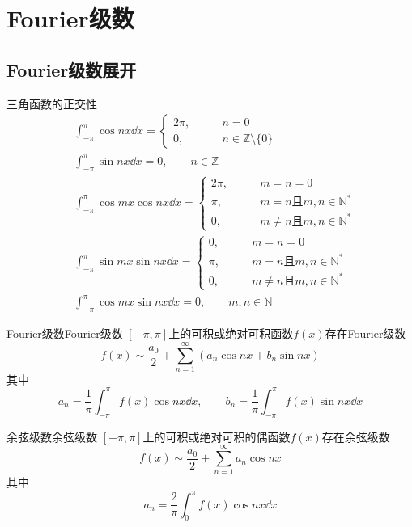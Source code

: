 \documentclass[lang = cn, scheme = chinese, thmcnt = section]{elegantbook}
\newcommand{\N}{\mathbb{N}}            %
\newcommand{\Z}{\mathbb{Z}}            %
\begin{document}
\chapter{Fourier级数}

\section{Fourier级数展开}

\begin{theorem}{三角函数的正交性}
	\begin{align*}
		& \int_{-\pi}^{\pi}\cos nx\dd x=\begin{cases}
			2\pi,\qquad & n=0\\
			0,\qquad & n\in\Z\setminus\{0\}
		\end{cases}\\
		& \int_{-\pi}^{\pi}\sin nx\dd x=0,\qquad n\in\Z\\
		& \int_{-\pi}^{\pi}\cos mx\cos nx \dd x=\begin{cases}
			2\pi,\qquad & m=n=0\\
			\pi,\qquad & m=n\text{且}m,n\in\N^*\\
			0,\qquad & m\ne n\text{且}m,n\in\N^*
		\end{cases}\\
		& \int_{-\pi}^{\pi}\sin mx\sin nx \dd x=\begin{cases}
			0,\qquad & m=n=0\\
			\pi,\qquad & m=n\text{且}m,n\in\N^*\\
			0,\qquad & m\ne n\text{且}m,n\in\N^*
		\end{cases}\\
		& \int_{-\pi}^{\pi}\cos mx\sin nx\dd x=0,\qquad m,n\in\N
	\end{align*}
\end{theorem}

\begin{theorem}{Fourier级数}{Fourier级数}
	$[-\pi,\pi]$上的可积或绝对可积函数$f(x)$存在Fourier级数
	$$
	f(x)\sim\frac{a_0}{2}+\sum_{n=1}^{\infty}(a_n\cos nx+b_n\sin nx)
	$$
	其中
	$$
	a_n=\frac{1}{\pi}\int_{-\pi}^{\pi}f(x)\cos n x\dd x,\qquad 
	b_n=\frac{1}{\pi}\int_{-\pi}^{\pi}f(x)\sin n x\dd x
	$$
\end{theorem}

\begin{theorem}{余弦级数}{余弦级数}
	$[-\pi,\pi]$上的可积或绝对可积的偶函数$f(x)$存在余弦级数
	$$
	f(x)\sim\frac{a_0}{2}+\sum_{n=1}^{\infty}a_n\cos nx
	$$
	其中
	$$
	a_n=\frac{2}{\pi}\int_{0}^{\pi}f(x)\cos n x\dd x
	$$
\end{theorem}
\end{document}
